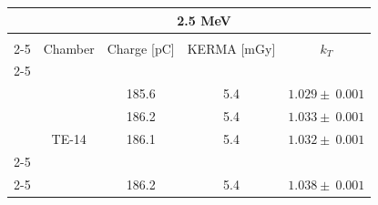 \begin{table}[!h]
\centering
\begin{tabular}{ccccc}
\hline
\rowcolor[HTML]{FCE0A7} 
\multicolumn{1}{|c}{\cellcolor[HTML]{FCE0A7}}                       & \multicolumn{4}{c|}{\cellcolor[HTML]{FCE0A7}2.5 \unit{\mega\electronvolt}}                                                                                                                  \\ \hline
                                                                    &                                 &                                         &                                         &                                                 \\ \cline{2-5} 
\multicolumn{1}{c|}{}                                               & \cellcolor[HTML]{D9D9D9}Chamber & \cellcolor[HTML]{D9D9D9}Charge {[}\unit{\pico\coulomb}{]} & \cellcolor[HTML]{D9D9D9}KERMA {[}\unit{\milli\gray}{]} & \multicolumn{1}{c|}{\cellcolor[HTML]{D9D9D9}$k_T$} \\ \cline{2-5} 
                                                                    &                                 &                                         &                                         &                                                 \\ \hline
\multicolumn{1}{|c|}{\cellcolor[HTML]{FEEFD1}}                      &                                 & 185.6                                  & 5.4                                     & \multicolumn{1}{c|}{$1.029 \pm \:0.001$}                      \\
\multicolumn{1}{|c|}{\cellcolor[HTML]{FEEFD1}}                      &                                 & 186.2                                  & 5.4                                     & \multicolumn{1}{c|}{$1.033 \pm \:0.001$}                      \\
\multicolumn{1}{|c|}{\cellcolor[HTML]{FEEFD1}}                      & \multirow{-3}{*}{TE-14}         & 186.1                                  & 5.4                                     & \multicolumn{1}{c|}{$1.032 \pm \:0.001$}                      \\ \cline{2-5} 
\multicolumn{1}{|c|}{\cellcolor[HTML]{FEEFD1}}                      &                                 &                                         &                                         &                                                 \\ \cline{2-5} 
\multicolumn{1}{|c|}{\cellcolor[HTML]{FEEFD1}}                      &                                 & 186.2                                  & 5.4                                     & \multicolumn{1}{c|}{$1.038 \pm \:0.001$}                      \\

\end{tabular}
\end{table}
